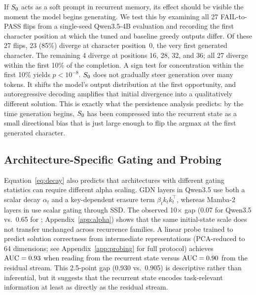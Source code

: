 \documentclass{article}
\begin{document}
If $S_0$ acts as a soft prompt in recurrent memory, its effect should be
visible the moment the model begins generating. We test this by examining all
27 FAIL-to-PASS flips from a single-seed Qwen3.5-4B evaluation and recording the
first character position at which the tuned and baseline greedy outputs differ. Of these 27 flips, 23 (85\%) diverge at character position~0, the very first generated character. The remaining 4 diverge at positions 16, 28, 32, and 36; all 27 diverge within the first 10\% of the completion. A sign test for concentration within the first 10\% yields $p < 10^{-8}$. $S_0$ does not gradually steer generation over many tokens. It shifts the model's output distribution at the first opportunity, and autoregressive decoding amplifies that initial divergence into a qualitatively different solution. This is exactly what the persistence analysis predicts: by the time generation begins,
$S_0$ has been compressed into the recurrent state as a small directional
bias that is just large enough to flip the argmax at the first generated character.

\subsection{Architecture-Specific Gating and Probing}
\label{sec:mech_probing}

Equation~\ref{eq:decay} also predicts that architectures with different gating
statistics can require different alpha scaling. GDN layers in Qwen3.5 use both
a scalar decay $\alpha_t$ and a key-dependent erasure term
$\beta_t k_t k_t^\top$, whereas Mamba-2 layers in \falcon use scalar gating
through SSD. The observed 10$\times$ gap (0.07 for Qwen3.5 vs.\ 0.65 for
\falcon; Appendix~\ref{app:alpha}) shows that the same initial-state scale
does not transfer unchanged across recurrence families. A linear probe trained to predict solution
correctness from intermediate representations (PCA-reduced to 64 dimensions;
see Appendix~\ref{app:probing} for full protocol) achieves
$\operatorname{AUC} = 0.93$ when reading from the recurrent state versus $\operatorname{AUC} = 0.90$ from
the residual stream. This 2.5-point gap (0.930 vs.\ 0.905) is descriptive
rather than inferential, but it suggests that the recurrent state encodes
task-relevant information at least as directly as the residual stream.

\end{document}
